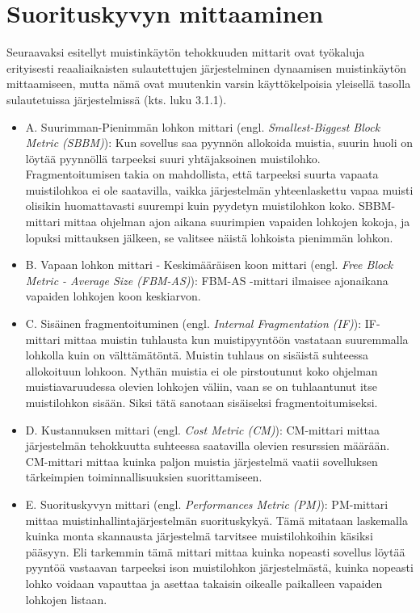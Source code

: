 \section{Suorituskyvyn mittaaminen}

Seuraavaksi esitellyt muistinkäytön tehokkuuden mittarit ovat työkaluja erityisesti reaaliaikaisten sulautettujen järjestelminen dynaamisen muistinkäytön mittaamiseen, mutta nämä ovat muutenkin varsin käyttökelpoisia yleisellä tasolla sulautetuissa järjestelmissä (kts. luku 3.1.1).

\begin{itemize}
\item{A. Suurimman-Pienimmän lohkon mittari (engl. \textit{Smallest-Biggest Block Metric (SBBM)}): Kun sovellus saa pyynnön allokoida muistia, suurin huoli on löytää pyynnöllä tarpeeksi suuri yhtäjaksoinen muistilohko. Fragmentoitumisen takia on mahdollista, että tarpeeksi suurta vapaata muistilohkoa ei ole saatavilla, vaikka järjestelmän yhteenlaskettu vapaa muisti olisikin huomattavasti suurempi kuin pyydetyn muistilohkon koko. SBBM-mittari mittaa ohjelman ajon aikana suurimpien vapaiden lohkojen kokoja, ja lopuksi mittauksen jälkeen, se valitsee näistä lohkoista pienimmän lohkon.}\cite{tmtt@2006}

\item{B. Vapaan lohkon mittari - Keskimääräisen koon mittari (engl. \textit{Free Block Metric - Average Size (FBM-AS)}): FBM-AS -mittari ilmaisee ajonaikana vapaiden lohkojen koon keskiarvon.}\cite{tmtt@2006}

\item{C. Sisäinen fragmentoituminen (engl. \textit{Internal Fragmentation (IF)}): IF-mittari mittaa muistin tuhlausta kun muistipyyntöön vastataan suuremmalla lohkolla kuin on välttämätöntä. Muistin tuhlaus on sisäistä suhteessa allokoituun lohkoon. Nythän muistia ei ole pirstoutunut koko ohjelman muistiavaruudessa olevien lohkojen väliin, vaan se on tuhlaantunut itse muistilohkon sisään. Siksi tätä sanotaan sisäiseksi fragmentoitumiseksi.}\cite{tmtt@2006}

\item{D. Kustannuksen mittari (engl. \textit{Cost Metric (CM)}): CM-mittari mittaa järjestelmän tehokkuutta suhteessa saatavilla olevien resurssien määrään. CM-mittari mittaa kuinka paljon muistia järjestelmä vaatii sovelluksen tärkeimpien toiminnallisuuksien suorittamiseen.}\cite{tmtt@2006}

\item{E. Suorituskyvyn mittari (engl. \textit{Performances Metric (PM)}): PM-mittari mittaa muistinhallintajärjestelmän suorituskykyä. Tämä mitataan laskemalla kuinka monta skannausta järjestelmä tarvitsee muistilohkoihin käsiksi pääsyyn. Eli tarkemmin tämä mittari mittaa kuinka nopeasti sovellus löytää pyyntöä vastaavan tarpeeksi ison muistilohkon järjestelmästä, kuinka nopeasti lohko voidaan vapauttaa ja asettaa takaisin oikealle paikalleen vapaiden lohkojen listaan.}\cite{tmtt@2006}

\end{itemize}

